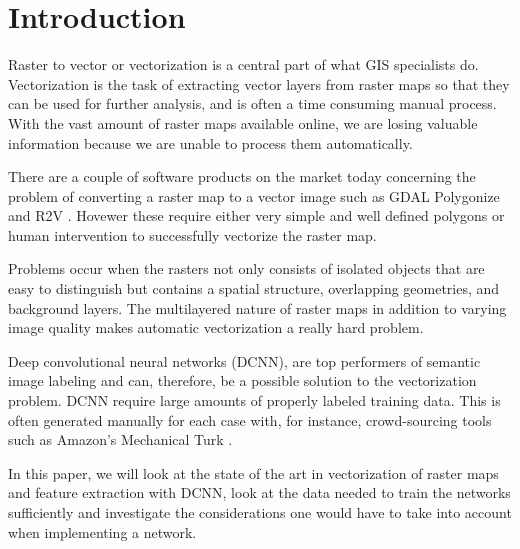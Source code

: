 \chapter{Introduction}
 Raster to vector or vectorization is a central part of what GIS specialists do. Vectorization is the task of extracting vector layers from raster maps so that they can be used for further analysis, and is often a time consuming manual process. With the vast amount of raster maps available online, we are losing valuable information because we are unable to process them automatically.

 There are a couple of software products on the market today concerning the problem of converting a raster map to a vector image such as GDAL Polygonize \cite{OSGeoa} and R2V \cite{Wu1999}. Hovewer these require either very simple and well defined polygons or human intervention to successfully vectorize the raster map.
 
 Problems occur when the rasters not only consists of isolated objects that are easy to distinguish but contains a spatial structure, overlapping geometries, and background layers. The multilayered nature of raster maps in addition to varying image quality makes automatic vectorization a really hard problem.
 
 Deep convolutional neural networks (DCNN), are top performers of semantic image labeling \citet{Krizhevsky2012} and can, therefore, be a possible solution to the vectorization problem. DCNN require large amounts of properly labeled training data. This is often generated manually for each case with, for instance, crowd-sourcing tools such as Amazon's Mechanical Turk \cite{Krizhevsky2012}.
 
 In this paper, we will look at the state of the art in vectorization of raster maps and feature extraction with DCNN, look at the data needed to train the networks sufficiently and investigate the considerations one would have to take into account when implementing a network.
